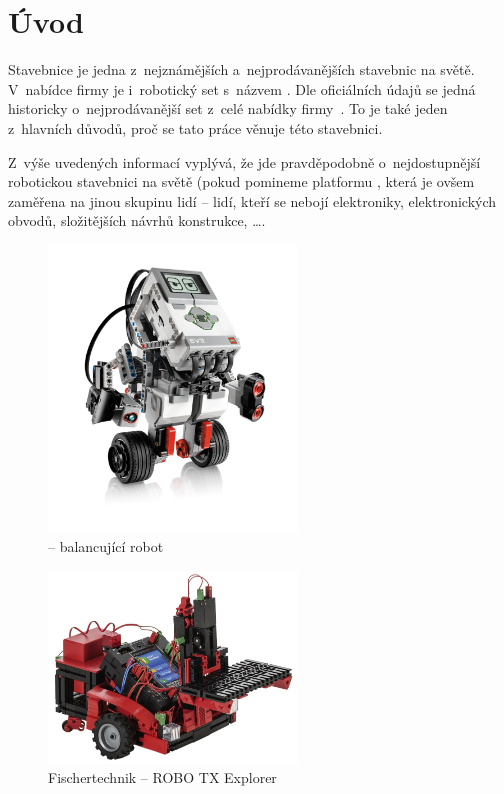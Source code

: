 \chapter{Úvod}

Stavebnice \lego{ }je jedna z~nejznámějších a~nejprodávanějších stavebnic na světě. 
V~nabídce firmy \lego{ }je i~robotický set s~názvem \legoM. 
Dle oficiálních údajů se jedná historicky o~nejprodávanější set z~celé nabídky firmy~\cite{legoGizmodo_SalesStatistic}. 
To je také jeden z~hlavních důvodů, proč se tato práce věnuje této stavebnici. 

Z~výše uvedených informací vyplývá, že jde pravděpodobně o~nejdostupnější robotickou stavebnici na světě (pokud pomineme platformu \arduino, která je ovšem zaměřena na jinou skupinu lidí -- lidí, kteří se nebojí elektroniky, elektronických obvodů, složitějších návrhů konstrukce, \dots{}.

\begin{figure}[h]
	\centering
	\includegraphics[width=250px]{images/lego-mindstorms-ev3_Robotics-for-Kids.png}
	\caption[\legoEV{ }-- samobalancující robot]{\legoEV{ }-- balancující robot\protect\footnotemark}
	\label{fig:lego-mindstorms-ev3_Robotics-for-Kids}
\end{figure}



\begin{figure}[h]
	\centering
	\includegraphics[width=250px]{images/fischertechnik_ROBO-TX-Explorer_02.jpg}
	\caption[Fischertechnik -- ROBO TX Explorer]{Fischertechnik -- ROBO TX Explorer\protect\footnotemark}
	\label{fig:fischertechnik_ROBO-TX-Explorer}
\end{figure}

